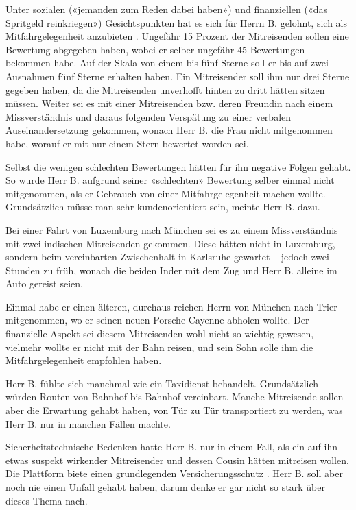 \documentclass[11pt,a4paper]{scrartcl}
\begin{document}
Unter sozialen («jemanden zum Reden dabei haben») und finanziellen («das Spritgeld reinkriegen») Gesichtspunkten hat es sich für Herrn B. gelohnt, sich als Mitfahrgelegenheit anzubieten \cite[Zeilen 49-53]{interview}. Ungefähr 15 Prozent der Mitreisenden sollen eine Bewertung abgegeben haben, wobei er selber ungefähr 45 Bewertungen bekommen habe. Auf der Skala von einem bis fünf Sterne soll er bis auf zwei Ausnahmen fünf Sterne erhalten haben. Ein Mitreisender soll ihm nur drei Sterne gegeben haben, da die Mitreisenden unverhofft hinten zu dritt hätten sitzen müssen. \cite[Zeilen 42-46]{interview} Weiter sei es mit einer Mitreisenden bzw. deren Freundin nach einem Missverständnis und daraus folgenden Verspätung zu einer verbalen Auseinandersetzung gekommen, wonach Herr B. die Frau nicht mitgenommen habe, worauf er mit nur einem Stern bewertet worden sei. \cite[Zeilen 86-104]{interview}

Selbst die wenigen schlechten Bewertungen hätten für ihn negative Folgen gehabt. So wurde Herr B. aufgrund seiner «schlechten» Bewertung selber einmal nicht mitgenommen, als er Gebrauch von einer Mitfahrgelegenheit machen wollte. \cite[Zeilen 152-159]{interview} Grundsätzlich müsse man sehr kundenorientiert sein, meinte Herr B. dazu. \cite[Zeilen 162-168]{interview}

Bei einer Fahrt von Luxemburg nach München sei es zu einem Missverständnis mit zwei indischen Mitreisenden gekommen. Diese hätten nicht in Luxemburg, sondern beim vereinbarten Zwischenhalt in Karlsruhe gewartet ‒ jedoch zwei Stunden zu früh, wonach die beiden Inder mit dem Zug und Herr B. alleine im Auto gereist seien. \cite[Zeilen 76-85]{interview}

Einmal habe er einen älteren, durchaus reichen Herrn von München nach Trier mitgenommen, wo er seinen neuen Porsche Cayenne abholen wollte. Der finanzielle Aspekt sei diesem Mitreisenden wohl nicht so wichtig gewesen, vielmehr wollte er nicht mit der Bahn reisen, und sein Sohn solle ihm die Mitfahrgelegenheit empfohlen haben. \cite[Zeilen 32-37]{interview}

Herr B. fühlte sich manchmal wie ein Taxidienst behandelt. Grundsätzlich würden Routen von Bahnhof bis Bahnhof vereinbart. Manche Mitreisende sollen aber die Erwartung gehabt haben, von Tür zu Tür transportiert zu werden, was Herr B. nur in manchen Fällen machte. \cite[Zeilen 111-114]{interview}

Sicherheitstechnische Bedenken hatte Herr B. nur in einem Fall, als ein auf ihn etwas suspekt wirkender Mitreisender und dessen Cousin hätten mitreisen wollen. \cite[Zeilen 117-123]{interview} Die Plattform biete einen grundlegenden Versicherungsschutz \cite[Zeilen 126-129]{interview}. Herr B. soll aber noch nie einen Unfall gehabt haben, darum denke er gar nicht so stark über dieses Thema nach. \cite[Zeilen 132-133]{interview}
\end{document}
